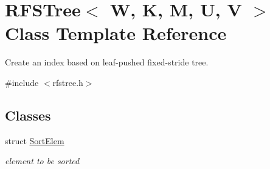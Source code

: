 \hypertarget{classRFSTree}{\section{R\-F\-S\-Tree$<$ W, K, M, U, V $>$ Class Template Reference}
\label{classRFSTree}
}


Create an index based on leaf-\/pushed fixed-\/stride tree.  




{\ttfamily \#include $<$rfstree.\-h$>$}

\subsection*{Classes}
\begin{DoxyCompactItemize}
\item 
struct \hyperlink{structRFSTree_1_1SortElem}{Sort\-Elem}
\begin{DoxyCompactList}\small\item\em element to be sorted \end{DoxyCompactList}\end{DoxyCompactItemize}
